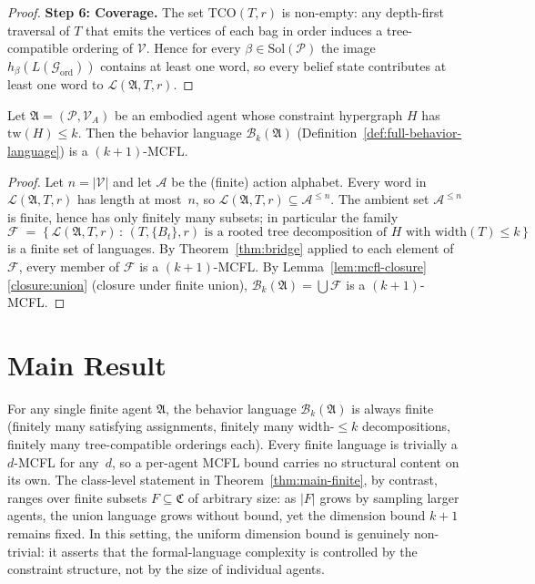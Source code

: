 \documentclass[runningheads]{llncs}
\begin{document}
\begin{proof}
\medskip
\noindent\textbf{Step 6: Coverage.}
The set $\mathrm{TCO}(T, r)$ is non-empty: any depth-first traversal of $T$ that emits the vertices of each bag in order induces a tree-compatible ordering of $\mathcal{V}$. Hence for every $\beta \in \mathrm{Sol}(\mathcal{P})$ the image $h_\beta(L(\mathcal{G}_{\mathrm{ord}}))$ contains at least one word, so every belief state contributes at least one word to $\mathcal{L}(\mathfrak{A}, T, r)$.
\end{proof}

\begin{theorem}\label{thm:full-bound}
Let $\mathfrak{A} = (\mathcal{P}, \mathcal{V}_A)$ be an embodied agent whose constraint hypergraph $H$ has $\mathrm{tw}(H) \leq k$. Then the behavior language $\mathcal{B}_k(\mathfrak{A})$ (Definition~\ref{def:full-behavior-language}) is a $(k{+}1)$-MCFL.
\end{theorem}

\begin{proof}
Let $n = |\mathcal{V}|$ and let $\mathcal{A}$ be the (finite) action alphabet. Every word in $\mathcal{L}(\mathfrak{A}, T, r)$ has length at most~$n$, so $\mathcal{L}(\mathfrak{A}, T, r) \subseteq \mathcal{A}^{\leq n}$. The ambient set $\mathcal{A}^{\leq n}$ is finite, hence has only finitely many subsets; in particular the family
\[
  \mathcal{F} \;=\; \bigl\{\, \mathcal{L}(\mathfrak{A}, T, r) \,:\, (T, \{B_t\}, r) \text{ is a rooted tree decomposition of } H \text{ with } \mathrm{width}(T) \leq k \,\bigr\}
\]
is a finite set of languages. By Theorem~\ref{thm:bridge} applied to each element of $\mathcal{F}$, every member of $\mathcal{F}$ is a $(k{+}1)$-MCFL. By Lemma~\ref{lem:mcfl-closure}\ref{closure:union} (closure under finite union), $\mathcal{B}_k(\mathfrak{A}) = \bigcup \mathcal{F}$ is a $(k{+}1)$-MCFL.
\end{proof}

\section{Main Result}\label{sec:main}

\begin{remark}\label{rem:non-vacuity}
For any single finite agent $\mathfrak{A}$, the behavior language $\mathcal{B}_k(\mathfrak{A})$ is always finite (finitely many satisfying assignments, finitely many width-$\leq k$ decompositions, finitely many tree-compatible orderings each).
Every finite language is trivially a $d$-MCFL for any~$d$, so a per-agent MCFL bound carries no structural content on its own.
The class-level statement in Theorem~\ref{thm:main-finite}, by contrast, ranges over finite subsets $F \subseteq \mathfrak{C}$ of arbitrary size: as $|F|$ grows by sampling larger agents, the union language grows without bound, yet the dimension bound $k+1$ remains fixed.
In this setting, the uniform dimension bound is genuinely non-trivial: it asserts that the formal-language complexity is controlled by the constraint structure, not by the size of individual agents.
\end{remark}
\end{document}
